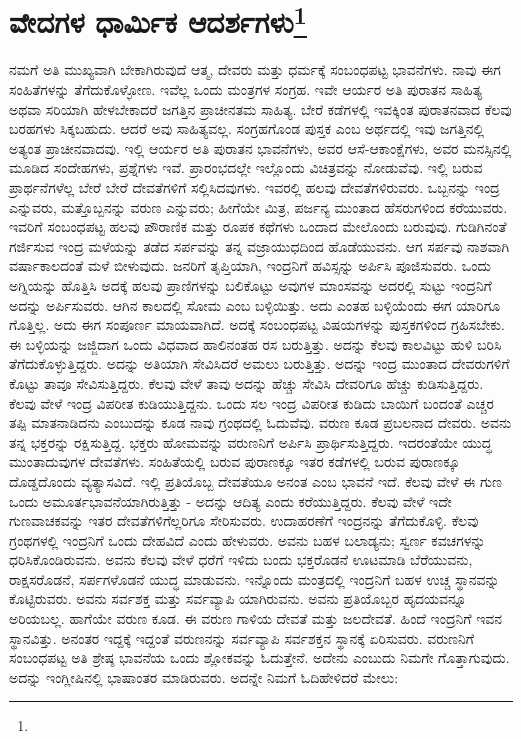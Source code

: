 
\chapter[ವೇದಗಳ ಧಾರ್ಮಿಕ ಆದರ್ಶಗಳು]{ವೇದಗಳ ಧಾರ್ಮಿಕ ಆದರ್ಶಗಳು\protect\footnote{}}

ನಮಗೆ ಅತಿ ಮುಖ್ಯವಾಗಿ ಬೇಕಾಗಿರುವುದೆ ಆತ್ಮ, ದೇವರು ಮತ್ತು ಧರ್ಮಕ್ಕೆ ಸಂಬಂಧಪಟ್ಟ ಭಾವನೆಗಳು. ನಾವು ಈಗ ಸಂಹಿತೆಗಳನ್ನು ತೆಗೆದುಕೊಳ್ಳೋಣ. ಇವೆಲ್ಲ ಒಂದು ಮಂತ್ರಗಳ ಸಂಗ್ರಹ. ಇವೇ ಆರ್ಯರ ಅತಿ ಪುರಾತನ ಸಾಹಿತ್ಯ ಅಥವಾ ಸರಿಯಾಗಿ ಹೇಳಬೇಕಾದರೆ ಜಗತ್ತಿನ ಪ್ರಾಚೀನತಮ ಸಾಹಿತ್ಯ. ಬೇರೆ ಕಡೆಗಳಲ್ಲಿ ಇವಕ್ಕಿಂತ ಪುರಾತನವಾದ ಕೆಲವು ಬರಹಗಳು ಸಿಕ್ಕಬಹುದು. ಆದರೆ ಅವು ಸಾಹಿತ್ಯವಲ್ಲ. ಸಂಗ್ರಹಗೊಂಡ ಪುಸ್ತಕ ಎಂಬ ಅರ್ಥದಲ್ಲಿ ಇವು ಜಗತ್ತಿನಲ್ಲಿ ಅತ್ಯಂತ ಪ್ರಾಚೀನವಾದವು. ಇಲ್ಲಿ ಆರ್ಯರ ಅತಿ ಪುರಾತನ ಭಾವನೆಗಳು, ಅವರ ಆಸೆ-ಆಕಾಂಕ್ಷೆಗಳು, ಅವರ ಮನಸ್ಸಿನಲ್ಲಿ ಮೂಡಿದ ಸಂದೇಹಗಳು, ಪ್ರಶ್ನೆಗಳು ಇವೆ. ಪ್ರಾರಂಭದಲ್ಲೇ ಇಲ್ಲೊಂದು ವಿಚಿತ್ರವನ್ನು ನೋಡುವೆವು. ಇಲ್ಲಿ ಬರುವ ಪ್ರಾರ್ಥನೆಗಳೆಲ್ಲ ಬೇರೆ ಬೇರೆ ದೇವತೆಗಳಿಗೆ ಸಲ್ಲಿಸಿದವುಗಳು. ಇವರಲ್ಲಿ ಹಲವು ದೇವತೆಗಳಿರುವರು. ಒಬ್ಬನನ್ನು ಇಂದ್ರ ಎನ್ನುವರು, ಮತ್ತೊಬ್ಬನನ್ನು ವರುಣ ಎನ್ನುವರು; ಹೀಗೆಯೇ ಮಿತ್ರ, ಪರ್ಜನ್ಯ ಮುಂತಾದ ಹೆಸರುಗಳಿಂದ ಕರೆಯುವರು. ಇವರಿಗೆ ಸಂಬಂಧಪಟ್ಟ ಹಲವು ಪೌರಾಣಿಕ ಮತ್ತು ರೂಪಕ ಕಥೆಗಳು ಒಂದಾದ ಮೇಲೊಂದು ಬರುವುವು. ಗುಡಿಗಿನಂತೆ ಗರ್ಜಿಸುವ ಇಂದ್ರ ಮಳೆಯನ್ನು ತಡೆದ ಸರ್ಪವನ್ನು ತನ್ನ ವಜ್ರಾಯುಧದಿಂದ ಹೊಡೆಯುವನು. ಆಗ ಸರ್ಪವು ನಾಶವಾಗಿ ವರ್ಷಾಕಾಲದಂತೆ ಮಳೆ ಬೀಳುವುದು. ಜನರಿಗೆ ತೃಪ್ತಿಯಾಗಿ, ಇಂದ್ರನಿಗೆ ಹವಿಸ್ಸನ್ನು ಅರ್ಪಿಸಿ ಪೂಜಿಸುವರು. ಒಂದು ಅಗ್ನಿಯನ್ನು ಹೊತ್ತಿಸಿ ಅದಕ್ಕೆ ಹಲವು ಪ್ರಾಣಿಗಳನ್ನು ಬಲಿಕೊಟ್ಟು ಅವುಗಳ ಮಾಂಸವನ್ನು ಅದರಲ್ಲಿ ಸುಟ್ಟು ಇಂದ್ರನಿಗೆ ಅದನ್ನು ಅರ್ಪಿಸುವರು. ಆಗಿನ ಕಾಲದಲ್ಲಿ ಸೋಮ ಎಂಬ ಬಳ್ಳಿಯಿತ್ತು. ಅದು ಎಂತಹ ಬಳ್ಳಿಯೆಂದು ಈಗ ಯಾರಿಗೂ ಗೊತ್ತಿಲ್ಲ. ಅದು ಈಗ ಸಂಪೂರ್ಣ ಮಾಯವಾಗಿದೆ. ಅದಕ್ಕೆ ಸಂಬಂಧಪಟ್ಟ ವಿಷಯಗಳನ್ನು ಪುಸ್ತಕಗಳಿಂದ ಗ್ರಹಿಸಬೇಕು. ಈ ಬಳ್ಳಿಯನ್ನು ಜಜ್ಜಿದಾಗ ಒಂದು ವಿಧವಾದ ಹಾಲಿನಂತಹ ರಸ ಬರುತ್ತಿತ್ತು. ಅದನ್ನು ಕೆಲವು ಕಾಲವಿಟ್ಟು ಹುಳಿ ಬರಿಸಿ ತೆಗೆದುಕೊಳ್ಳುತ್ತಿದ್ದರು. ಅದನ್ನು ಅತಿಯಾಗಿ ಸೇವಿಸಿದರೆ ಅಮಲು ಬರುತ್ತಿತ್ತು. ಅದನ್ನು ಇಂದ್ರ ಮುಂತಾದ ದೇವರುಗಳಿಗೆ ಕೊಟ್ಟು ತಾವೂ ಸೇವಿಸುತ್ತಿದ್ದರು. ಕೆಲವು ವೇಳೆ ತಾವು ಅದನ್ನು ಹೆಚ್ಚು ಸೇವಿಸಿ ದೇವರಿಗೂ ಹೆಚ್ಚು ಕುಡಿಸುತ್ತಿದ್ದರು. ಕೆಲವು ವೇಳೆ ಇಂದ್ರ ವಿಪರೀತ ಕುಡಿಯುತ್ತಿದ್ದನು. ಒಂದು ಸಲ ಇಂದ್ರ ವಿಪರೀತ ಕುಡಿದು ಬಾಯಿಗೆ ಬಂದಂತೆ ಎಚ್ಚರ ತಪ್ಪಿ ಮಾತನಾಡಿದನು ಎಂಬುದನ್ನು ಕೂಡ ನಾವು ಗ್ರಂಥದಲ್ಲಿ ಓದುವೆವು. ವರುಣ ಕೂಡ ಪ್ರಬಲನಾದ ದೇವರು. ಅವನು ತನ್ನ ಭಕ್ತರನ್ನು ರಕ್ಷಿಸುತ್ತಿದ್ದ. ಭಕ್ತರು ಹೋಮವನ್ನು ವರುಣನಿಗೆ ಅರ್ಪಿಸಿ ಪ್ರಾರ್ಥಿಸುತ್ತಿದ್ದರು. ಇದರಂತೆಯೇ ಯುದ್ಧ ಮುಂತಾದುವುಗಳ ದೇವತೆಗಳು. ಸಂಹಿತೆಯಲ್ಲಿ ಬರುವ ಪುರಾಣಕ್ಕೂ ಇತರ ಕಡೆಗಳಲ್ಲಿ ಬರುವ ಪುರಾಣಕ್ಕೂ ದೊಡ್ಡದೊಂದು ವ್ಯತ್ಯಾಸವಿದೆ. ಇಲ್ಲಿ ಪ್ರತಿಯೊಬ್ಬ ದೇವತೆಯೂ ಅನಂತ ಎಂಬ ಭಾವನೆ ಇದೆ. ಕೆಲವು ವೇಳೆ ಈ ಗುಣ ಒಂದು ಅಮೂರ್ತಭಾವನೆಯಾಗಿರುತ್ತಿತ್ತು - ಅದನ್ನು ಆದಿತ್ಯ ಎಂದು ಕರೆಯುತ್ತಿದ್ದರು. ಕೆಲವು ವೇಳೆ ಇದೇ ಗುಣವಾಚಕವನ್ನು ಇತರ ದೇವತೆಗಳಿಗೆಲ್ಲರಿಗೂ ಸೇರಿಸುವರು. ಉದಾಹರಣೆಗೆ ಇಂದ್ರನನ್ನು ತೆಗೆದುಕೊಳ್ಳಿ. ಕೆಲವು ಗ್ರಂಥಗಳಲ್ಲಿ ಇಂದ್ರನಿಗೆ ಒಂದು ದೇಹವಿದೆ ಎಂದು ಹೇಳುವರು. ಅವನು ಬಹಳ ಬಲಾಡ್ಯನು; ಸ್ವರ್ಣ ಕವಚಗಳನ್ನು ಧರಿಸಿಕೊಂಡಿರುವನು. ಅವನು ಕೆಲವು ವೇಳೆ ಧರೆಗೆ ಇಳಿದು ಬಂದು ಭಕ್ತರೊಡನೆ ಊಟಮಾಡಿ ಬೆರೆಯುವನು, ರಾಕ್ಷಸರೊಡನೆ, ಸರ್ಪಗಳೊಡನೆ ಯುದ್ಧ ಮಾಡುವನು. ಇನ್ನೊಂದು ಮಂತ್ರದಲ್ಲಿ ಇಂದ್ರನಿಗೆ ಬಹಳ ಉಚ್ಚ ಸ್ಥಾನವನ್ನು ಕೊಟ್ಟಿರುವರು. ಅವನು ಸರ್ವಶಕ್ತ ಮತ್ತು ಸರ್ವವ್ಯಾಪಿ ಯಾಗಿರುವನು. ಅವನು ಪ್ರತಿಯೊಬ್ಬರ ಹೃದಯವನ್ನೂ ಅರಿಯಬಲ್ಲ. ಹಾಗೆಯೇ ವರುಣ ಕೂಡ. ಈ ವರುಣ ಗಾಳಿಯ ದೇವತೆ ಮತ್ತು ಜಲದೇವತೆ. ಹಿಂದೆ ಇಂದ್ರನಿಗೆ ಇವನ ಸ್ಥಾನವಿತ್ತು. ಅನಂತರ ಇದ್ದಕ್ಕೆ ಇದ್ದಂತೆ ವರುಣನನ್ನು ಸರ್ವವ್ಯಾಪಿ ಸರ್ವಶಕ್ತನ ಸ್ಥಾನಕ್ಕೆ ಏರಿಸುವರು. ವರುಣನಿಗೆ ಸಂಬಂಧಪಟ್ಟ ಅತಿ ಶ್ರೇಷ್ಠ ಭಾವನೆಯ ಒಂದು ಶ್ಲೋಕವನ್ನು ಓದುತ್ತೇನೆ. ಅದೇನು ಎಂಬುದು ನಿಮಗೇ ಗೊತ್ತಾಗುವುದು. ಅದನ್ನು ಇಂಗ್ಲೀಷಿನಲ್ಲಿ ಭಾಷಾಂತರ ಮಾಡಿರುವರು. ಅದನ್ನೇ ನಿಮಗೆ ಓದಿಹೇಳಿದರೆ ಮೇಲು:

